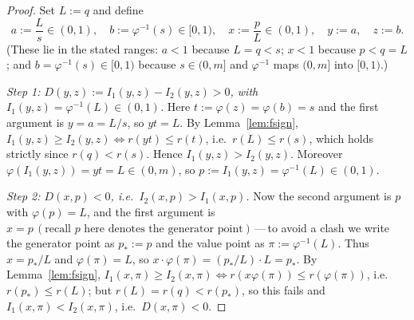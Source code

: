\documentclass{amsart}
\theoremstyle{plain}
\theoremstyle{definition}
\begin{document}
\begin{proof}
Set $L:=q$ and define
\begin{equation}\label{eq:joinpts}
a:=\frac{L}{s}\in(0,1),\quad b:=\varphi^{-1}(s)\in[0,1),\quad
x:=\frac{p}{L}\in(0,1),\quad y:=a,\quad z:=b.
\end{equation}
(These lie in the stated ranges: $a<1$ because $L=q<s$; $x<1$ because $p<q=L$; and
$b=\varphi^{-1}(s)\in[0,1)$ because $s\in(0,m]$ and $\varphi^{-1}$ maps $(0,m]$ into
$[0,1)$.)

\emph{Step 1: $D(y,z):=I_1(y,z)-I_2(y,z)>0$, with $I_1(y,z)=\varphi^{-1}(L)\in(0,1)$.}
Here $t:=\varphi(z)=\varphi(b)=s$ and the first argument is $y=a=L/s$, so $yt=L$.  By
Lemma~\ref{lem:fsign}, $I_1(y,z)\ge I_2(y,z)\iff r(yt)\le r(t)$, i.e.\ $r(L)\le r(s)$, which
holds strictly since $r(q)<r(s)$.  Hence $I_1(y,z)>I_2(y,z)$.  Moreover
$\varphi(I_1(y,z))=yt=L\in(0,m)$, so $p:=I_1(y,z)=\varphi^{-1}(L)\in(0,1)$.

\emph{Step 2: $D(x,p)<0$, i.e.\ $I_2(x,p)>I_1(x,p)$.}  Now the second argument is $p$ with
$\varphi(p)=L$, and the first argument is $x=p\,(\text{recall }p\text{ here denotes the
generator point})$\,---\,to avoid a clash we write the generator point as $p_\ast:=p$ and the
value point as $\pi:=\varphi^{-1}(L)$.  Thus $x=p_\ast/L$ and $\varphi(\pi)=L$, so
$x\cdot\varphi(\pi)=(p_\ast/L)\cdot L=p_\ast$.  By Lemma~\ref{lem:fsign},
$I_1(x,\pi)\ge I_2(x,\pi)\iff r(x\varphi(\pi))\le r(\varphi(\pi))$, i.e.\ $r(p_\ast)\le
r(L)$; but $r(L)=r(q)<r(p_\ast)$, so this fails and $I_1(x,\pi)<I_2(x,\pi)$, i.e.\
$D(x,\pi)<0$.


\end{proof}
\end{document}
